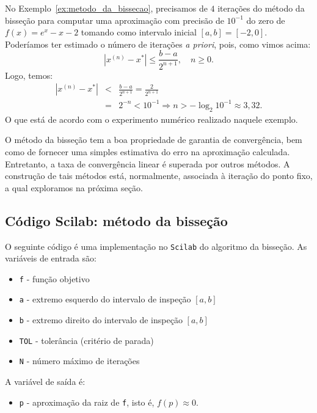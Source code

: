 \begin{ex}No Exemplo~\ref{ex:metodo_da_bissecao}, precisamos de $4$ iterações do método da bisseção para computar uma aproximação com precisão de $10^{-1}$ do zero de $f(x) = e^x - x - 2$ tomando como intervalo inicial $[a, b] = [-2, 0]$. Poderíamos ter estimado o número de iterações \emph{a priori}, pois, como vimos acima:
  \begin{equation}
    |x^{(n)}-x^*|\leq \frac{b-a}{2^{n+1}},\quad n\geq 0.
  \end{equation}
Logo, temos:
\begin{eqnarray}
  |x^{(n)} - x^*| &<& \frac{b - a}{2^{n+1}} = \frac{2}{2^{n+1}}\\
  &=& 2^{-n} < 10^{-1} \Rightarrow  n > -\log_2 10^{-1} \approx 3,32.
\end{eqnarray}
O que está de acordo com o experimento numérico realizado naquele exemplo.
\end{ex}

O método da bisseção tem a boa propriedade de garantia de convergência, bem como de fornecer uma simples estimativa do erro na aproximação calculada. Entretanto, a taxa de convergência linear é superada por outros métodos. A construção de tais métodos está, normalmente, associada à iteração do ponto fixo, a qual exploramos na próxima seção.

\ifisscilab
\subsection{Código Scilab: método da bisseção}\label{subsec:codigo_bissecao}

O seguinte código é uma implementação no \verb+Scilab+ do algoritmo da bisseção. As variáveis de entrada são:
\begin{itemize}
\item \verb+f+ - função objetivo
\item \verb+a+ - extremo esquerdo do intervalo de inspeção $[a, b]$
\item \verb+b+ - extremo direito do intervalo de inspeção $[a, b]$
\item \verb+TOL+ - tolerância (critério de parada)
\item \verb+N+ - número máximo de iterações
\end{itemize}
A variável de saída é:
\begin{itemize}
\item \verb+p+ - aproximação da raiz de \verb+f+, isto é, $f(p) \approx 0$.
\end{itemize}


